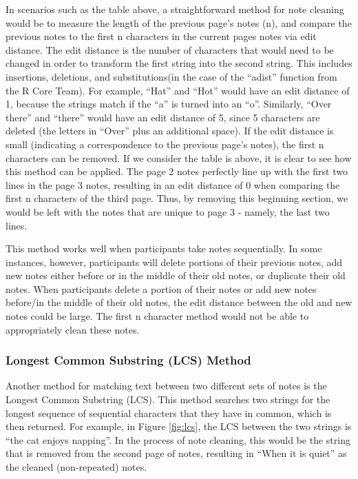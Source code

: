 \documentclass[print]{nuthesis}
\begin{document}
In scenarios such as the table above, a straightforward method for note cleaning would be to measure the length of the previous page's notes (n), and compare the previous notes to the first n characters in the current pages notes via edit distance.
The edit distance is the number of characters that would need to be changed in order to transform the first string into the second string.
This includes insertions, deletions, and substitutions(in the case of the ``adist'' function from the R Core Team).
For example, ``Hat'' and ``Hot'' would have an edit distance of 1, because the strings match if the ``a'' is turned into an ``o''.
Similarly, ``Over there'' and ``there'' would have an edit distance of 5, since 5 characters are deleted (the letters in ``Over'' plus an additional space).
If the edit distance is small (indicating a correspondence to the previous page's notes), the first n characters can be removed.
If we consider the table is above, it is clear to see how this method can be applied.
The page 2 notes perfectly line up with the first two lines in the page 3 notes, resulting in an edit distance of 0 when comparing the first n characters of the third page.
Thus, by removing this beginning section, we would be left with the notes that are unique to page 3 - namely, the last two lines.

This method works well when participants take notes sequentially.
In some instances, however, participants will delete portions of their previous notes, add new notes either before or in the middle of their old notes, or duplicate their old notes.
When participants delete a portion of their notes or add new notes before/in the middle of their old notes, the edit distance between the old and new notes could be large.
The first n character method would not be able to appropriately clean these notes.

\hypertarget{longest-common-substring-lcs-method}{%
\subsubsection{Longest Common Substring (LCS) Method}\label{longest-common-substring-lcs-method}}

Another method for matching text between two different sets of notes is the Longest Common Substring (LCS).
This method searches two strings for the longest sequence of sequential characters that they have in common, which is then returned.
For example, in Figure \ref{fig:lcs}, the LCS between the two strings is ``the cat enjoys napping''.
In the process of note cleaning, this would be the string that is removed from the second page of notes, resulting in ``When it is quiet'' as the cleaned (non-repeated) notes.
\end{document}
